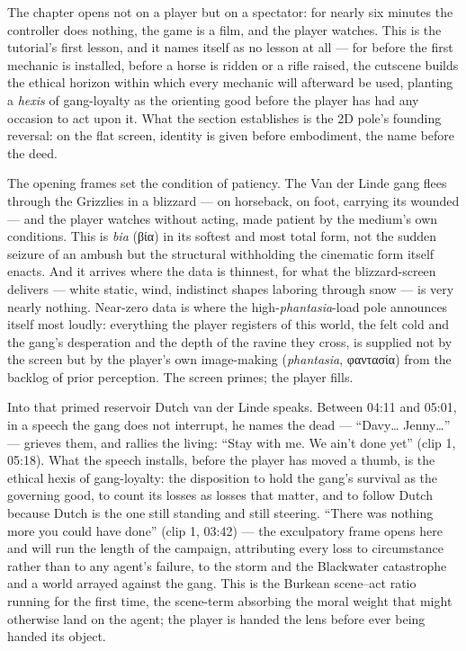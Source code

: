 \documentclass{article}
\newcommand{\gk}[1]{{\greekfont #1}}
\begin{document}
The chapter opens not on a player but on a spectator: for nearly six minutes the controller does nothing, the game is a film, and the player watches. This is the tutorial's first lesson, and it names itself as no lesson at all — for before the first mechanic is installed, before a horse is ridden or a rifle raised, the cutscene builds the ethical horizon within which every mechanic will afterward be used, planting a \textit{hexis} of gang-loyalty as the orienting good before the player has had any occasion to act upon it. What the section establishes is the 2D pole's founding reversal: on the flat screen, identity is given before embodiment, the name before the deed.

The opening frames set the condition of patiency. The Van der Linde gang flees through the Grizzlies in a blizzard — on horseback, on foot, carrying its wounded — and the player watches without acting, made patient by the medium's own conditions. This is \textit{bia} (\gk{βία}) in its softest and most total form, not the sudden seizure of an ambush but the structural withholding the cinematic form itself enacts. And it arrives where the data is thinnest, for what the blizzard-screen delivers — white static, wind, indistinct shapes laboring through snow — is very nearly nothing. Near-zero data is where the high-\textit{phantasia}-load pole announces itself most loudly: everything the player registers of this world, the felt cold and the gang's desperation and the depth of the ravine they cross, is supplied not by the screen but by the player's own image-making (\textit{phantasia}, \gk{φαντασία}) from the backlog of prior perception. The screen primes; the player fills.

Into that primed reservoir Dutch van der Linde speaks. Between 04:11 and 05:01, in a speech the gang does not interrupt, he names the dead — ``Davy… Jenny…'' — grieves them, and rallies the living: ``Stay with me. We ain't done yet'' (clip 1, 05:18). What the speech installs, before the player has moved a thumb, is the ethical hexis of gang-loyalty: the disposition to hold the gang's survival as the governing good, to count its losses as losses that matter, and to follow Dutch because Dutch is the one still standing and still steering. ``There was nothing more you could have done'' (clip 1, 03:42) — the exculpatory frame opens here and will run the length of the campaign, attributing every loss to circumstance rather than to any agent's failure, to the storm and the Blackwater catastrophe and a world arrayed against the gang. This is the Burkean scene–act ratio running for the first time, the scene-term absorbing the moral weight that might otherwise land on the agent; the player is handed the lens before ever being handed its object.
\end{document}
